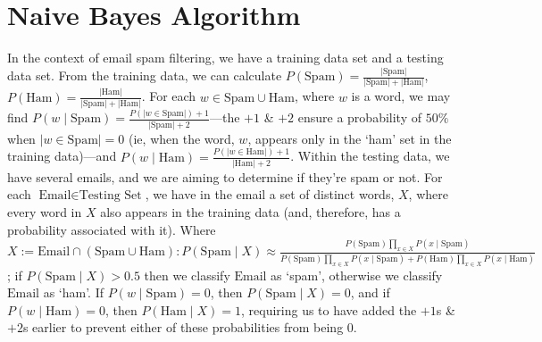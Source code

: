 
\section{Naive Bayes Algorithm}\label{sec:naive_bayes_algorithm}

In the context of email spam filtering, we have a training data set and a testing data set. From the training data, we can calculate $P(\text{Spam}) = \frac{|\text{Spam}|}{|\text{Spam}| + |\text{Ham}|}$, $P(\text{Ham}) = \frac{|\text{Ham}|}{|\text{Spam}| + |\text{Ham}|}$. For each $w \in \text{Spam} \cup \text{Ham}$, where $w$ is a word, we may find $P(w \mid \text{Spam}) = \frac{P(|w \in \text{Spam}|) + 1}{|\text{Spam}| + 2}$---the $+1$ \& $+2$ ensure a probability of $50\%$ when $|w \in \text{Spam}| = 0$ (ie, when the word, $w$, appears only in the `ham' set in the training data)---and $P(w \mid \text{Ham}) = \frac{P(|w \in \text{Ham}|) + 1}{|\text{Ham}| + 2}$. Within the testing data, we have several emails, and we are aiming to determine if they're spam or not. For each $\text{Email} \in \text{Testing Set}$, we have in the email a set of distinct words, $X$, where every word in $X$ also appears in the training data (and, therefore, has a probability associated with it). Where $X := \text{Email} \cap (\text{Spam} \cup \text{Ham}): P(\text{Spam} \mid X) \approx \frac{P(\text{Spam}) \underset{x \in X}{\prod} P(x \mid \text{Spam})}{P(\text{Spam}) \underset{x \in X}{\prod} P(x \mid \text{Spam}) + P(\text{Ham}) \underset{x \in X}{\prod} P(x \mid \text{Ham})}$; if $P(\text{Spam} \mid X) > 0.5$ then we classify $\text{Email}$ as `spam', otherwise we classify $\text{Email}$ as `ham'. If $P(w \mid \text{Spam}) = 0$, then $P(\text{Spam} \mid X) = 0$, and if $P(w \mid \text{Ham}) = 0$, then $P(\text{Ham} \mid X) = 1$, requiring us to have added the $+1$s \& $+2$s earlier to prevent either of these probabilities from being $0$.


